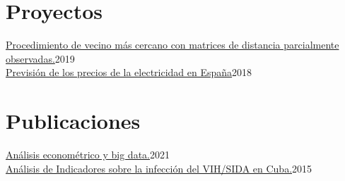 \documentclass{muratcan_cv}
\begin{document}
\section{Proyectos} 
\datedexperience
	{\href{https://github.com/aldofranco91/TFM_Ing_Mat/blob/master/!!Tesis/Aldo_TFM.pdf}{Procedimiento de vecino más cercano con matrices de distancia parcialmente observadas.}}{2019} 
	 \\
%
\datedexperience
	{\href{https://github.com/aldofranco91/TFM_Big_Data/blob/master/!!Tesis/Aldo_TFM.pdf}{Previsión de los precios de la electricidad en España}}{2018} 

\section{Publicaciones}
\datedexperience
{\href{https://www.funcas.es/wp-content/uploads/2021/06/An\%C3\%A1lisis-econom\%C3\%A9trico-y-big-data.pdf}{Análisis econométrico y big data.}}{2021} \\
%
\datedexperience
{\href{https://1library.co/document/y4x1l85z-encuesta-indicadores-prevencion-infeccion-vih-sida.html}{Análisis de Indicadores sobre la infección del VIH/SIDA en Cuba.}}{2015} 

\end{document}
